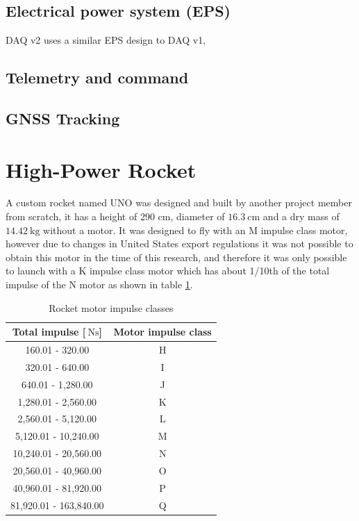 \documentclass[a4paper,11pt]{article}
\begin{document}
\subsection{Electrical power system (EPS)}

DAQ v2 uses a similar EPS design to DAQ v1, 

\subsection{Telemetry and command}
\subsection{GNSS Tracking}

\section{High-Power Rocket}

A custom rocket named UNO was designed and built by another project member from scratch, it has a height of 290 cm, diameter of $\SI{16.3}{\centi\meter}$ and a dry mass of $\SI{14.42}{\kilo\gram}$ without a motor. It was designed to fly with an M impulse class motor, however due to changes in United States export regulations it was not possible to obtain this motor in the time of this research, and therefore it was only possible to launch with a K impulse class motor which has about 1/10th of the total impulse of the N motor as shown in table \ref{tabl:impulseclasses}.

\begin{table}[H]
\centering
\label{tabl:impulseclasses}
\begin{tabular}{|c|c|}
  Total impulse [$\SI{}{\newton\second}$] & Motor impulse class \\
  \hline
  160.01 - 320.00         & H \\
  320.01 - 640.00         & I \\
  640.01 - 1,280.00       & J \\
  1,280.01 - 2,560.00     & K \\
  2,560.01 - 5,120.00     & L \\
  5,120.01 - 10,240.00    & M \\
  10,240.01 - 20,560.00   & N \\
  20,560.01 - 40,960.00   & O \\
  40,960.01 - 81,920.00   & P \\
  81,920.01 - 163,840.00  & Q \\
\end{tabular}
\caption{Rocket motor impulse classes \cite{nfpa2018}}
\end{table}
\end{document}
